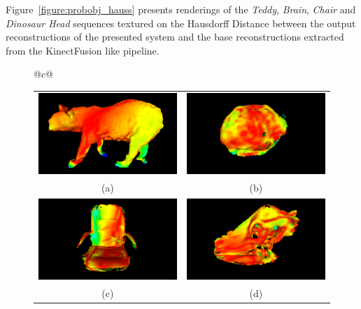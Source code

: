 Figure~\ref{figure:probobj_hauss} presents renderings of the \textit{Teddy}, 
\textit{Brain}, \textit{Chair} and \textit{Dinosaur Head} sequences textured 
on the Hausdorff Distance between the output reconstructions of the presented 
system and the base reconstructions extracted from the KinectFusion like pipeline.

\begin{figure}[!htbp]
  \centering
  \begin{tabular}{@{}c@{}}
    \begin{tabular}{cc}
      \includegraphics[width=.4\linewidth]{figures/object_recon/hauss/bear.png}&
      \includegraphics[width=.4\linewidth]{figures/object_recon/hauss/brain.png}\\
      (a) & (b) \\
      \includegraphics[width=.4\linewidth]{figures/object_recon/hauss/chair.png}&
      \includegraphics[width=.4\linewidth]{figures/object_recon/hauss/dino.png} \\
      (c) & (d) \\
    \end{tabular} \\
    \begin{tabular}{ccc}

\end{tabular}
\end{tabular}
\end{figure}

